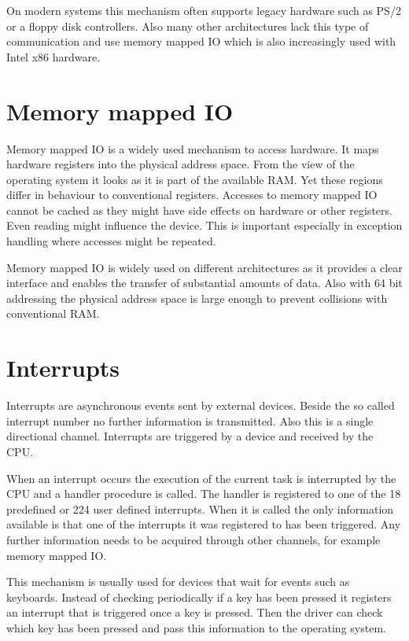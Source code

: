 \documentclass[
a4paper,
12pt,
notitlepage,
parskip=half,
DIV=11,
]{scrbook}
\begin{document}
	On modern systems this mechanism often supports legacy hardware such as PS/2 or a floppy disk controllers.
	Also many other architectures lack this type of communication and use memory mapped IO which is also increasingly used with Intel x86 hardware.
	\citep{ioports} \citep{intelmanual}
	
	\section{Memory mapped IO}
	
	Memory mapped IO is a widely used mechanism to access hardware.
	It maps hardware registers into the physical address space.
	From the view of the operating system it looks as it is part of the available RAM.
	Yet these regions differ in behaviour to conventional registers.
	Accesses to memory mapped IO cannot be cached as they might have side effects on hardware or other registers.
	Even reading might influence the device.
	This is important especially in exception handling where accesses might be repeated.
	
	Memory mapped IO is widely used on different architectures as it provides a clear interface and enables the transfer of substantial amounts of data.
	Also with 64 bit addressing the physical address space is large enough to prevent collisions with conventional RAM.
	\citep{intelmanual}
	
	\section{Interrupts}
	
	Interrupts are asynchronous events sent by external devices.
	Beside the so called interrupt number no further information is transmitted.
	Also this is a single directional channel.
	Interrupts are triggered by a device and received by the CPU.
	
	When an interrupt occurs the execution of the current task is interrupted by the CPU and a handler procedure is called.
	The handler is registered to one of the 18 predefined or 224 user defined interrupts.
	When it is called the only information available is that one of the interrupts it was registered to has been triggered.
	Any further information needs to be acquired through other channels, for example memory mapped IO. \citep{intelmanual}
	
	This mechanism is usually used for devices that wait for events such as keyboards.
	Instead of checking periodically if a key has been pressed it registers an interrupt that is triggered once a key is pressed.
	Then the driver can check which key has been pressed and pass this information to the operating system.
	
\end{document}

